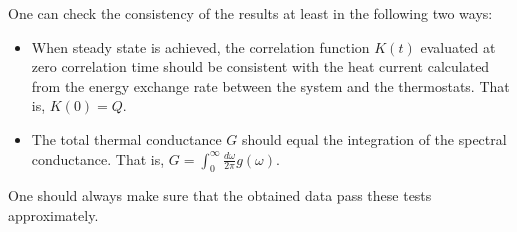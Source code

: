\documentclass[12pt,a4paper]{report}
\begin{document}
One can check the consistency of the results at least in the following two ways:
\begin{itemize}
\item When steady state is achieved, the correlation function $K(t)$ evaluated at zero correlation time should be consistent with the heat current calculated from the energy exchange rate between the system and the thermostats. That is, $K(0)=Q$.
\item The total thermal conductance $G$ should equal the integration of the spectral conductance. That is, $G = \int_0^{\infty} \frac{d\omega}{2\pi} g(\omega)$.
\end{itemize}
One should always make sure that the obtained data pass these tests approximately.



\end{document}
